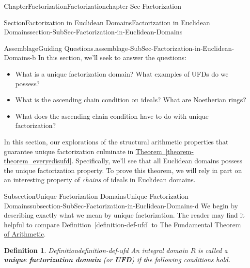 \documentclass[oneside,10pt,]{book}
\newcommand{\xreffont}{\relax}
\newcommand{\terminology}[1]{\textbf{#1}}
\numberwithin{equation}{section}
\newtheorem{definition}[theorem]{Definition}
\begin{document}
\begin{chapterptx}{Chapter}{Factorization}{}{Factorization}{}{}{chapter-Sec-Factorization}
\typeout{************************************************}
%
\begin{sectionptx}{Section}{Factorization in Euclidean Domains}{}{Factorization in Euclidean Domains}{}{}{section-SubSec-Factorization-in-Euclidean-Domains}
\begin{assemblage}{Assemblage}{Guiding Questions.}{assemblage-SubSec-Factorization-in-Euclidean-Domains-b}%
In this section, we'll seek to answer the questions: %
\begin{itemize}[label=\textbullet]
\item{}What is a unique factorization domain? What examples of UFDs do we possess?%
\item{}What is the ascending chain condition on ideals? What are Noetherian rings?%
\item{}What does the ascending chain condition have to do with unique factorization?%
\end{itemize}
%
\end{assemblage}
\begin{introduction}{}%
In this section, our explorations of the structural arithmetic properties that guarantee unique factorization culminate in \hyperref[theorem-theorem_everyedisufd]{Theorem~{\xreffont\ref{theorem-theorem_everyedisufd}}}. Specifically, we'll see that all Euclidean domains possess the unique factorization property. To prove this theorem, we will rely in part on an interesting property of \emph{chains} of ideals in Euclidean domains.%
\end{introduction}%
%
%
\typeout{************************************************}
\typeout{************************************************}
%
\begin{subsectionptx}{Subsection}{Unique Factorization Domains}{}{Unique Factorization Domains}{}{}{subsection-SubSec-Factorization-in-Euclidean-Domains-d}
We begin by describing exactly what we mean by unique factorization. The reader may find it helpful to compare \hyperref[definition-def-ufd]{Definition~{\xreffont\ref{definition-def-ufd}}} to \hyperref[assemblage-ftarith]{The Fundamental Theorem of Arithmetic}.%
\begin{definition}{Definition}{}{definition-def-ufd}%
%
An integral domain \(R\) is called a \terminology{unique factorization domain} (or \terminology{UFD}) if the following conditions hold.%
\begin{enumerate}

\end{enumerate}
\end{definition}
\end{subsectionptx}
\end{sectionptx}
\end{chapterptx}
\end{document}
